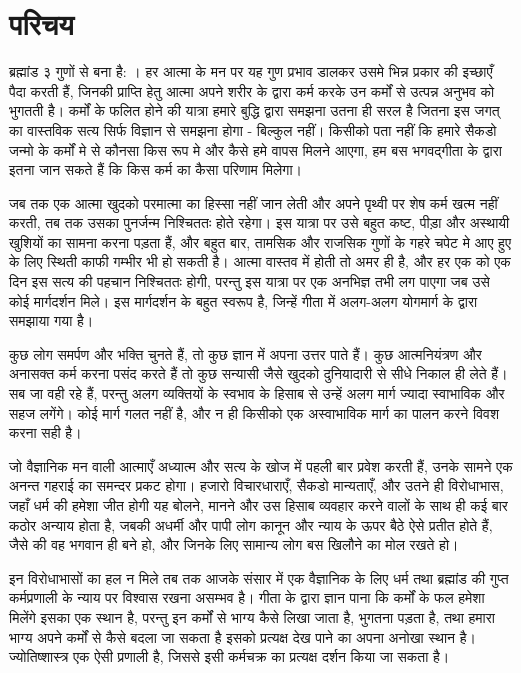 \chapter*{परिचय} \label{chap:pref}
ब्रह्मांड ३ गुणों से बना है: । हर आत्मा के मन पर यह गुण प्रभाव डालकर उसमे भिन्न प्रकार की इच्छाएँ पैदा करती हैं, जिनकी प्राप्ति हेतु आत्मा अपने शरीर के द्वारा कर्म करके उन कर्मों से उत्पन्न अनुभव को भुगतती है। कर्मों के फलित होने की यात्रा हमारे बुद्धि द्वारा समझना  उतना ही सरल है जितना इस जगत् का वास्तविक सत्य सिर्फ विज्ञान से समझना होगा - बिल्कुल नहीं। किसीको पता नहीं कि हमारे सैकडो जन्मो के कर्मों मे से कौनसा किस रूप मे और कैसे हमे वापस मिलने आएगा, हम बस भगवद्गीता के द्वारा इतना जान सकते हैं कि किस कर्म का कैसा परिणाम मिलेगा।

जब तक एक आत्मा खुदको परमात्मा का हिस्सा नहीं जान लेती और अपने पृथ्वी पर शेष कर्म खत्म नहीं करती, तब तक उसका पुनर्जन्म निश्चिततः होते रहेगा। इस यात्रा पर  उसे बहुत कष्ट, पीड़ा और अस्थायी खुशियों का सामना करना पड़ता हैं, और बहुत बार, तामसिक और राजसिक गुणों के गहरे चपेट मे आए हुए के लिए स्थिती काफी गम्भीर भी हो सकती है। आत्मा वास्तव में होती तो अमर ही है, और हर एक को एक दिन इस सत्य की पहचान निश्चिततः होगी, परन्तु इस यात्रा पर एक अनभिज्ञ तभी लग पाएगा जब उसे कोई मार्गदर्शन मिले। इस मार्गदर्शन  के बहुत स्वरूप है, जिन्हें गीता में अलग-अलग योगमार्ग के द्वारा समझाया गया है।

कुछ लोग समर्पण और भक्ति चुनते हैं, तो कुछ ज्ञान में अपना उत्तर पाते हैं। कुछ आत्मनियंत्रण और अनासक्त कर्म करना पसंद करते हैं तो कुछ सन्यासी जैसे खुदको दुनियादारी से सीधे निकाल ही लेते हैं। सब जा वही रहे हैं, परन्तु अलग व्यक्तियों के स्वभाव के हिसाब से उन्हें अलग मार्ग ज्यादा स्वाभाविक और सहज लगेंगे। कोई मार्ग गलत नहीं है, और न ही किसीको एक अस्वाभाविक मार्ग का पालन करने विवश करना सही है।

जो वैज्ञानिक मन वाली आत्माएँ अध्यात्म और सत्य के खोज में पहली बार प्रवेश करती हैं, उनके सामने एक अनन्त गहराई का समन्दर प्रकट होगा। हजारो विचारधाराएँ, सैकडो मान्यताएँ, और उतने ही विरोधाभास, जहाँ धर्म की हमेशा जीत होगी यह बोलने, मानने और उस हिसाब व्यवहार करने वालों के साथ ही कई बार कठोर  अन्याय होता है, जबकी अधर्मी और पापी लोग कानून और न्याय के ऊपर बैठे ऐसे प्रतीत होते हैं, जैसे की  वह भगवान ही बने हो, और जिनके लिए सामान्य लोग बस खिलौने का मोल रखते हो।

इन विरोधाभासों का हल न मिले तब तक आजके संसार में एक वैज्ञानिक के लिए धर्म तथा ब्रह्मांड की गुप्त कर्मप्रणाली के न्याय पर विश्वास रखना असम्भव है। गीता के द्वारा ज्ञान पाना कि कर्मों के फल हमेशा मिलेंगे इसका एक स्थान है, परन्तु इन कर्मों से भाग्य कैसे लिखा जाता है, भुगतना पड़ता है, तथा हमारा भाग्य अपने कर्मों से कैसे बदला जा सकता है इसको प्रत्यक्ष देख पाने का अपना अनोखा स्थान है। ज्योतिष्शास्त्र एक ऐसी प्रणाली है, जिससे इसी कर्मचक्र का प्रत्यक्ष दर्शन किया  जा सकता है।

